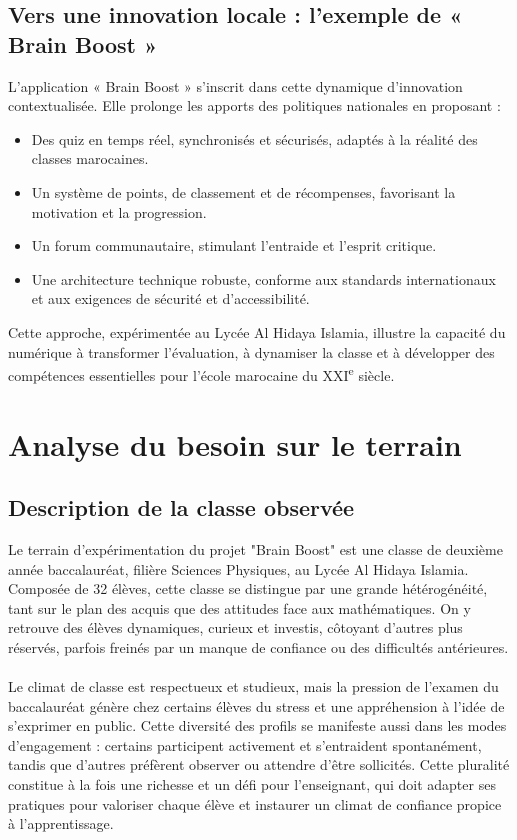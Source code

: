\documentclass[a4paper,11pt]{report}
\begin{document}
\subsection{Vers une innovation locale : l'exemple de « Brain Boost »}
L'application « Brain Boost » s'inscrit dans cette dynamique d'innovation contextualisée. Elle prolonge les apports des politiques nationales en proposant :
\begin{itemize}
    \item Des quiz en temps réel, synchronisés et sécurisés, adaptés à la réalité des classes marocaines.
    \item Un système de points, de classement et de récompenses, favorisant la motivation et la progression.
    \item Un forum communautaire, stimulant l'entraide et l'esprit critique.
    \item Une architecture technique robuste, conforme aux standards internationaux et aux exigences de sécurité et d'accessibilité.
\end{itemize}
Cette approche, expérimentée au Lycée Al Hidaya Islamia, illustre la capacité du numérique à transformer l'évaluation, à dynamiser la classe et à développer des compétences essentielles pour l'école marocaine du XXI\textsuperscript{e} siècle.

\section{Analyse du besoin sur le terrain}

\subsection{Description de la classe observée}
Le terrain d'expérimentation du projet "Brain Boost" est une classe de deuxième année baccalauréat, filière Sciences Physiques, au Lycée Al Hidaya Islamia. Composée de 32 élèves, cette classe se distingue par une grande hétérogénéité, tant sur le plan des acquis que des attitudes face aux mathématiques. On y retrouve des élèves dynamiques, curieux et investis, côtoyant d'autres plus réservés, parfois freinés par un manque de confiance ou des difficultés antérieures.\\ \\
Le climat de classe est respectueux et studieux, mais la pression de l'examen du baccalauréat génère chez certains élèves du stress et une appréhension à l'idée de s'exprimer en public. Cette diversité des profils se manifeste aussi dans les modes d'engagement : certains participent activement et s'entraident spontanément, tandis que d'autres préfèrent observer ou attendre d'être sollicités. Cette pluralité constitue à la fois une richesse et un défi pour l'enseignant, qui doit adapter ses pratiques pour valoriser chaque élève et instaurer un climat de confiance propice à l'apprentissage.
\end{document}

